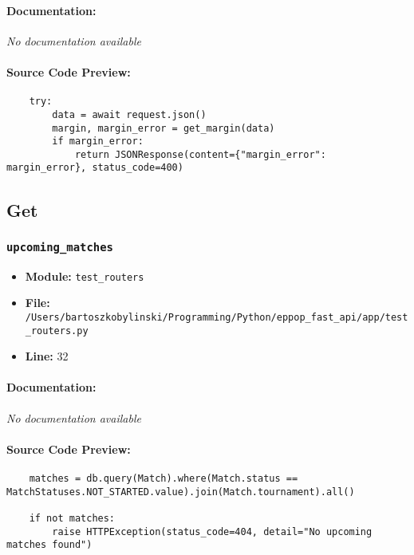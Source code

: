 \documentclass[11pt,a4paper]{article}
\begin{document}
\paragraph{Documentation:} \textit{No documentation available}

\paragraph{Source Code Preview:}
\begin{verbatim}
    try:
        data = await request.json()
        margin, margin_error = get_margin(data)
        if margin_error:
            return JSONResponse(content={"margin_error": margin_error}, status_code=400)
\end{verbatim}

\vspace{1em}
\subsection{Get}

\subsubsection{\texttt{upcoming\_matches}}

\begin{itemize}
    \item \textbf{Module:} \texttt{test\_routers}
    \item \textbf{File:} \texttt{/Users/bartoszkobylinski/Programming/Python/eppop\_fast\_api/app/test\_routers.py}
    \item \textbf{Line:} 32
\end{itemize}

\paragraph{Documentation:} \textit{No documentation available}

\paragraph{Source Code Preview:}
\begin{verbatim}
    matches = db.query(Match).where(Match.status == MatchStatuses.NOT_STARTED.value).join(Match.tournament).all()

    if not matches:
        raise HTTPException(status_code=404, detail="No upcoming matches found")

\end{verbatim}
\end{document}
